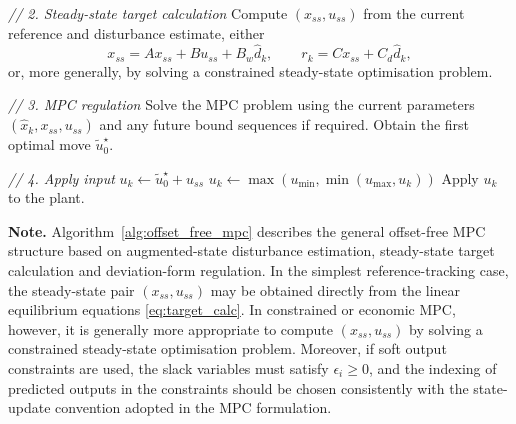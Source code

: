 \begin{algorithm}
\begin{algorithmic}[1]
		
		\State \textit{// 2. Steady-state target calculation}
		\State Compute \((x_{ss},u_{ss})\) from the current reference and disturbance estimate, either
		\[
		x_{ss}=Ax_{ss}+Bu_{ss}+B_w\hat d_k,\qquad
		r_k=Cx_{ss}+C_d\hat d_k,
		\]
		or, more generally, by solving a constrained steady-state optimisation problem.
		
		\State \textit{// 3. MPC regulation}
		\State Solve the MPC problem using the current parameters \((\hat x_k,x_{ss},u_{ss})\) and any future bound sequences if required.
		\State Obtain the first optimal move \(\tilde u_0^\star\).
		
		\State \textit{// 4. Apply input}
		\State \(u_k \gets \tilde u_0^\star + u_{ss}\)
		\State \(u_k \gets \max(u_{\min},\min(u_{\max},u_k))\)
		\State Apply \(u_k\) to the plant.
		\EndFor
		\EndProcedure
	\end{algorithmic}
\end{algorithm}

\noindent\textbf{Note.}
Algorithm~\ref{alg:offset_free_mpc} describes the general offset-free MPC structure based on augmented-state disturbance estimation, steady-state target calculation and deviation-form regulation. In the simplest reference-tracking case, the steady-state pair \((x_{ss},u_{ss})\) may be obtained directly from the linear equilibrium equations \eqref{eq:target_calc}. In constrained or economic MPC, however, it is generally more appropriate to compute \((x_{ss},u_{ss})\) by solving a constrained steady-state optimisation problem. Moreover, if soft output constraints are used, the slack variables must satisfy \(\epsilon_i \ge 0\), and the indexing of predicted outputs in the constraints should be chosen consistently with the state-update convention adopted in the MPC formulation.

